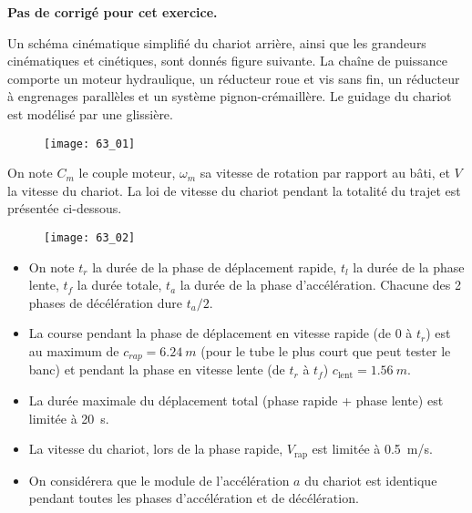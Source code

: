 \normaltrue
\correctionfalse


\setcounter{numques}{0}
\ifcorrection
\else
\textbf{Pas de corrigé pour cet exercice.}
\fi

\ifprof
\else
Un schéma cinématique simplifié du chariot arrière, ainsi que les grandeurs cinématiques et cinétiques,
sont donnés figure suivante.
La chaîne de puissance comporte un moteur hydraulique, un réducteur roue et vis sans fin, un réducteur à
engrenages parallèles et un système pignon-crémaillère.
Le guidage du chariot est modélisé par une glissière.



\begin{figure}[H]
\centering
\texttt{[image: 63\_01]}
\end{figure}


On note $C_m$  le couple moteur, $\omega_m$ sa vitesse de rotation par rapport au bâti, et $V$ la vitesse du chariot.
La loi de vitesse du chariot pendant la totalité du trajet est présentée ci-dessous.

\begin{figure}[H]
\centering
\texttt{[image: 63\_02]}
\end{figure}


\begin{itemize}
\item On note $t_r$ la durée de la phase de déplacement rapide, $t_l$ la durée de la phase lente, $t_f$ la durée
totale, $t_a$ la durée de la phase d'accélération. Chacune des 2 phases de décélération dure $t_a/2$.
\item La course pendant la phase de déplacement en vitesse rapide (de 0 à $t_r$) est au maximum de
$c_{rap}= \SI{6,24}{m}$ (pour le tube le plus court que peut tester le banc) et pendant la phase en vitesse
lente (de $t_r$ à $t_f$) $c_{\text{lent}}= \SI{1,56}{m}$.
\item La durée maximale du déplacement total (phase rapide + phase lente) est limitée à \SI{20}{s}.
\item La vitesse du chariot, lors de la phase rapide, $V_{\text{rap}}$ est limitée à \SI{0,5}{m/s}.
\item On considérera que le module de l'accélération $a$ du chariot est identique pendant toutes les
phases d'accélération et de décélération.
\end{itemize}

